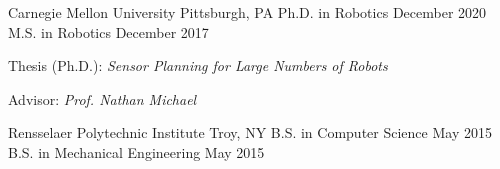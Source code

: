 
\begin{cventries}
  \cventrytwo
  {Carnegie Mellon University}
  {Pittsburgh, PA}
  {Ph.D. in Robotics}
  {December 2020}
  {}
  {M.S. in Robotics}
  {December 2017}
  {
    \begin{cvitems} %
    \item {Thesis (Ph.D.): \emph{Sensor Planning for Large Numbers of Robots}}
    \item {Advisor: \emph{Prof. Nathan Michael}}
    \end{cvitems}
  }

  \cventrytwo
  {Rensselaer Polytechnic Institute} %
  {Troy, NY} %
  {B.S. in Computer Science} %
  {May 2015} %
  {}
  {B.S. in Mechanical Engineering} %
  {May 2015} %
  {}
\end{cventries}


